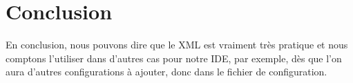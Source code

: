 \documentclass[a4paper,12pt]{article}
\begin{document}
\section{Conclusion}

En conclusion, nous pouvons dire que le XML est vraiment très pratique et nous comptons l'utiliser dans d'autres cas pour notre IDE, par exemple, dès que l'on aura d'autres configurations à ajouter, donc dans le fichier de configuration. 
		
\end{document}
